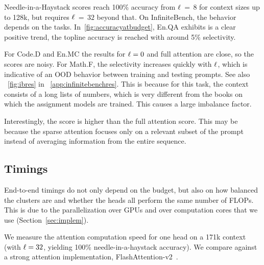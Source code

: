 Needle-in-a-Haystack scores reach 100\% accuracy from $\ell$\,$=$\,$8$ for context sizes up to 128k, but requires $\ell$\,$=$\,$32$ beyond that. 
%
On InfiniteBench, the behavior depends on the tasks. 
 In~\autoref{fig:accuracyatbudget}, En.QA exhibits is a clear positive trend, the topline accuracy is reached with around 5\% selectivity. 
 
For Code.D and En.MC the results for $\ell = 0$ and full attention are close, so the scores are noisy. 
For Math.F, the selectivity increases quickly with $\ell$, which is indicative of an OOD behavior between training and testing prompts. See also ~\autoref{fig:ibres} in ~\autoref{app:infinitebenchres}.   
This is because for this task, the context consists of a long lists of numbers, which is very different from the books on which the assignment models are trained. 
This causes a large imbalance factor.

Interestingly, the \OURS{} score is higher than the full attention score. 
This may be because the sparse attention focuses only on a relevant subset of the prompt instead of averaging information from the entire sequence.



\subsection{Timings}


End-to-end timings do not only depend on the budget, but also on how balanced the clusters are and whether the heads all perform the same number of FLOPs. 
This is due to the parallelization over GPUs and over computation cores that we use (Section~\ref{sec:implem}).

We measure the attention computation speed for one head on a 171k context (with $\ell=32$, yielding 100\% needle-in-a-haystack accuracy). 
We compare against a strong attention implementation, FlashAttention-v2~\cite{dao2023flash}. 

%
%
%
\begin{center}
\end{center}


